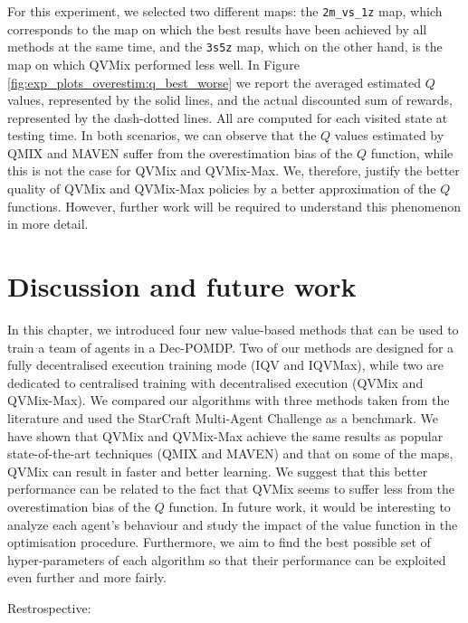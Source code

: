 For this experiment, we selected two different maps: the \texttt{2m\_vs\_1z} map, which corresponds to the map on which the best results have been achieved by all methods at the same time, and the \texttt{3s5z} map, which on the other hand, is the map on which QVMix performed less well.
In Figure \ref{fig:exp_plots_overestim:q_best_worse} we report the averaged estimated $Q$ values, represented by the solid lines, and the actual discounted sum of rewards, represented by the dash-dotted lines.
All are computed for each visited state at testing time.
In both scenarios, we can observe that the $Q$ values estimated by QMIX and MAVEN suffer from the overestimation bias of the $Q$ function, while this is not the case for QVMix and QVMix-Max.
We, therefore, justify the better quality of QVMix and QVMix-Max policies by a better approximation of the $Q$ functions.
However, further work will be required to understand this phenomenon in more detail.


\section{Discussion and future work} \label{sec:ch4_conclusion}

In this chapter, we introduced four new value-based methods that can be used to train a team of agents in a Dec-POMDP.
Two of our methods are designed for a fully decentralised execution training mode (IQV and IQVMax), while two are dedicated to centralised training with decentralised execution (QVMix and QVMix-Max).
We compared our algorithms with three methods taken from the literature and used the StarCraft Multi-Agent Challenge as a benchmark. 
We have shown that QVMix and QVMix-Max achieve the same results as popular state-of-the-art techniques (QMIX and MAVEN) and that on some of the maps, QVMix can result in faster and better learning.
We suggest that this better performance can be related to the fact that QVMix seems to suffer less from the overestimation bias of the $Q$ function.
In future work, it would be interesting to analyze each agent's behaviour and study the impact of the value function in the optimisation procedure.
Furthermore, we aim to find the best possible set of hyper-parameters of each algorithm so that their performance can be exploited even further and more fairly.

Restrospective: